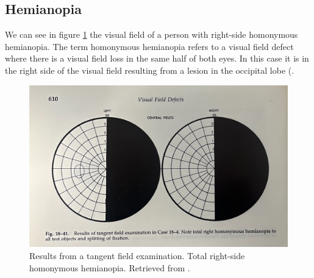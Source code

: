 \documentclass{l4proj}
\begin{document}
\begin{appendices}
\subsection{Hemianopia} \label{appendix:hemianopia}
We can see in figure \ref{fig:appendix_vfd} the visual field of a person with right-side homonymous hemianopia. The term homonymous hemianopia refers to a visual field defect where there is a visual field loss in the same half of both eyes. In this case it is in the right side of the visual field resulting from a lesion in the occipital lobe (\citep{walsh1992neuro}.
\begin{figure}[htbp]
    \centering
    \includegraphics[width=0.9\linewidth]{dissertation/images/Hemianopia_right.png}   
    \caption{Results from a tangent field examination. Total right-side homonymous hemianopia. Retrieved from \citet{walsh1992neuro}.}
    \label{fig:appendix_vfd}
\end{figure}
\newpage

\end{appendices}
\end{document}
